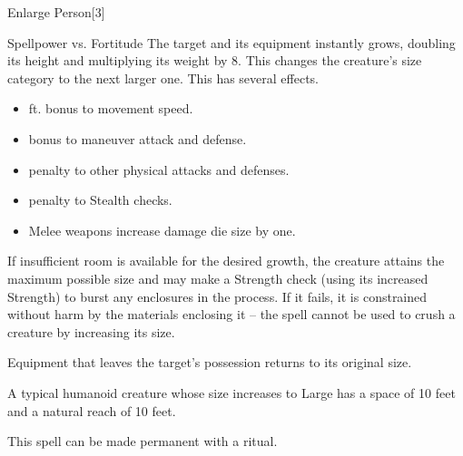 \begin{spellsection}{Enlarge Person}[3]
    \begin{spellheader}
    \end{spellheader}
    \begin{spellcontent}
        \begin{spelltargetinginfo}
        \end{spelltargetinginfo}
        \begin{spelleffects}
            \begin{spellattack}{Spellpower vs. Fortitude}
                \spellsuccess The target and its equipment instantly grows, doubling its height and multiplying its weight by 8. This changes the creature's size category to the next larger one. This has several effects.
                \begin{itemize}
                    \item {} ft. bonus to movement speed.
                    \item {} bonus to maneuver attack and defense.
                    \item {} penalty to other physical attacks and defenses.
                    \item {} penalty to Stealth checks.
                    \item Melee weapons increase damage die size by one.
                \end{itemize}
                \par If insufficient room is available for the desired growth, the creature attains the maximum possible size and may make a Strength check (using its increased Strength) to burst any enclosures in the process. If it fails, it is constrained without harm by the materials enclosing it -- the spell cannot be used to crush a creature by increasing its size.
                \par Equipment that leaves the target's possession returns to its original size.
            \end{spellattack}
            \spelldur \durshort \dismissable
        \end{spelleffects}
    \end{spellcontent}
    \begin{spellfooter}
        \spellnotes A typical humanoid creature whose size increases to Large has a space of 10 feet and a natural reach of 10 feet. \sizingspellnotes

        This spell can be made permanent with a  ritual.
        \miscastrandom
    \end{spellfooter}
\end{spellsection}

